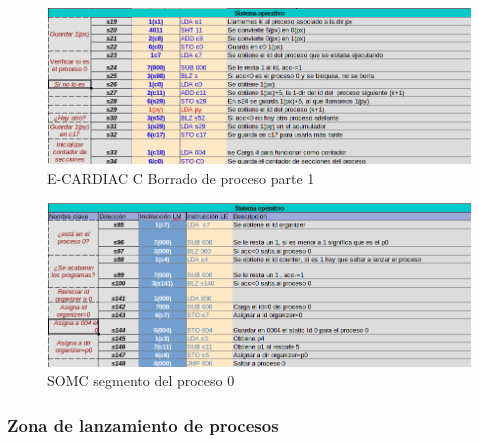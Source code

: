 \documentclass[letterpaper,12pt,oneside]{book}
\begin{document}
		\begin{figure}[h]		
			\centering
			\includegraphics[scale=0.53]{media/CARDIACC/SO_Borrar1.png}
			\caption{ E-CARDIAC C Borrado de proceso parte 1}
			\label{fig:somcBorrar1}
		\end{figure}
		
		\begin{figure}[h]		
			\centering
			\includegraphics[scale=0.53]{media/CARDIACC/SO_Proceso0.png}
			\caption{ SOMC segmento del proceso 0}
			\label{fig:somcNuceloP0}
		\end{figure}
		


		\subsubsection{Zona de lanzamiento de procesos}		
		
\end{document}
